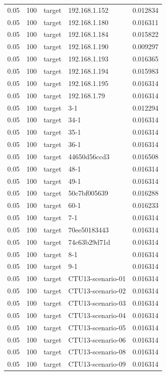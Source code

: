 \begin{tabular}{lllll}
0.05 & 100 & target & 192.168.1.152 & 0.012834 \\
0.05 & 100 & target & 192.168.1.180 & 0.016311 \\
0.05 & 100 & target & 192.168.1.184 & 0.015822 \\
0.05 & 100 & target & 192.168.1.190 & 0.009297 \\
0.05 & 100 & target & 192.168.1.193 & 0.016365 \\
0.05 & 100 & target & 192.168.1.194 & 0.015983 \\
0.05 & 100 & target & 192.168.1.195 & 0.016314 \\
0.05 & 100 & target & 192.168.1.79 & 0.016314 \\
0.05 & 100 & target & 3-1 & 0.012294 \\
0.05 & 100 & target & 34-1 & 0.016314 \\
0.05 & 100 & target & 35-1 & 0.016314 \\
0.05 & 100 & target & 36-1 & 0.016314 \\
0.05 & 100 & target & 44650d56ccd3 & 0.016508 \\
0.05 & 100 & target & 48-1 & 0.016314 \\
0.05 & 100 & target & 49-1 & 0.016314 \\
0.05 & 100 & target & 50c7bf005639 & 0.016288 \\
0.05 & 100 & target & 60-1 & 0.016233 \\
0.05 & 100 & target & 7-1 & 0.016314 \\
0.05 & 100 & target & 70ee50183443 & 0.016314 \\
0.05 & 100 & target & 74c63b29d71d & 0.016314 \\
0.05 & 100 & target & 8-1 & 0.016314 \\
0.05 & 100 & target & 9-1 & 0.016314 \\
0.05 & 100 & target & CTU13-scenario-01 & 0.016314 \\
0.05 & 100 & target & CTU13-scenario-02 & 0.016314 \\
0.05 & 100 & target & CTU13-scenario-03 & 0.016314 \\
0.05 & 100 & target & CTU13-scenario-04 & 0.016314 \\
0.05 & 100 & target & CTU13-scenario-05 & 0.016314 \\
0.05 & 100 & target & CTU13-scenario-06 & 0.016314 \\
0.05 & 100 & target & CTU13-scenario-08 & 0.016314 \\
0.05 & 100 & target & CTU13-scenario-09 & 0.016314 \\

\end{tabular}
